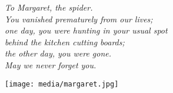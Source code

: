 {
\noindent
\raggedleft
\emph{To Margaret, the spider.\\You vanished prematurely from our lives;\\one day, you were hunting in your usual spot\\behind the kitchen cutting boards;\\the other day, you were gone.\\[0.5em]May we never forget you.}\\
\vfill
\raggedright
\texttt{[image: media/margaret.jpg]}
\vfill
{}
\clearpage
}